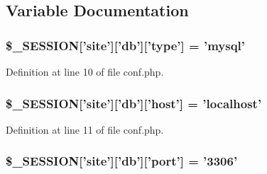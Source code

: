 \subsection{\-Variable \-Documentation}
\hypertarget{sites_2default_2conf_8php_a3a4fa49ab6dddfa9c346db822685ecbe}{
\subsubsection[{\$\-\_\-\-S\-E\-S\-S\-I\-O\-N}]{\setlength{\rightskip}{0pt plus 5cm}\$\-\_\-\-S\-E\-S\-S\-I\-O\-N\mbox{[}'site'\mbox{]}\mbox{[}'db'\mbox{]}\mbox{[}'type'\mbox{]} = 'mysql'}}\label{sites_2default_2conf_8php_a3a4fa49ab6dddfa9c346db822685ecbe}


\-Definition at line 10 of file conf.\-php.

\hypertarget{sites_2default_2conf_8php_aa19fa0436dd2ec0b53315caa21c96832}{
\subsubsection[{\$\-\_\-\-S\-E\-S\-S\-I\-O\-N}]{\setlength{\rightskip}{0pt plus 5cm}\$\-\_\-\-S\-E\-S\-S\-I\-O\-N\mbox{[}'site'\mbox{]}\mbox{[}'db'\mbox{]}\mbox{[}'host'\mbox{]} = 'localhost'}}\label{sites_2default_2conf_8php_aa19fa0436dd2ec0b53315caa21c96832}


\-Definition at line 11 of file conf.\-php.

\hypertarget{sites_2default_2conf_8php_afa8532c41f4264b9170e9e67f350eb32}{
\subsubsection[{\$\-\_\-\-S\-E\-S\-S\-I\-O\-N}]{\setlength{\rightskip}{0pt plus 5cm}\$\-\_\-\-S\-E\-S\-S\-I\-O\-N\mbox{[}'site'\mbox{]}\mbox{[}'db'\mbox{]}\mbox{[}'port'\mbox{]} = '3306'}}\label{sites_2default_2conf_8php_afa8532c41f4264b9170e9e67f350eb32}


